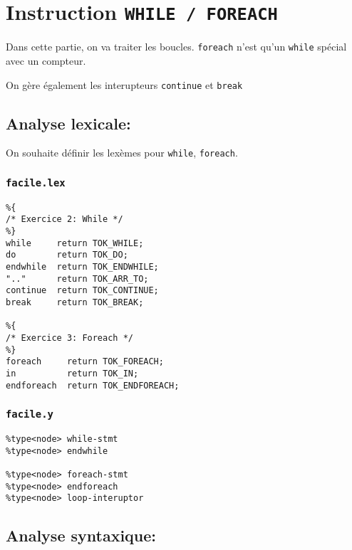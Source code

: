 \documentclass[11pt]{article}
\begin{document}
    \hypertarget{instruction-while-foreach}{%
\section{\texorpdfstring{Instruction
\texttt{WHILE\ /\ FOREACH}}{Instruction WHILE / FOREACH}}\label{instruction-while-foreach}}

Dans cette partie, on va traiter les boucles. \texttt{foreach} n'est
qu'un \texttt{while} spécial avec un compteur.

On gère également les interupteurs \texttt{continue} et \texttt{break}

    \hypertarget{analyse-lexicale}{%
\subsection{Analyse lexicale:}\label{analyse-lexicale}}

On souhaite définir les lexèmes pour \texttt{while}, \texttt{foreach}.

\hypertarget{facile.lex}{%
\subsubsection{\texorpdfstring{\texttt{facile.lex}}{facile.lex}}\label{facile.lex}}

\begin{verbatim}
%{
/* Exercice 2: While */ 
%}
while     return TOK_WHILE;
do        return TOK_DO;
endwhile  return TOK_ENDWHILE;
".."      return TOK_ARR_TO;
continue  return TOK_CONTINUE;
break     return TOK_BREAK;

%{
/* Exercice 3: Foreach */ 
%}
foreach     return TOK_FOREACH;
in          return TOK_IN;
endforeach  return TOK_ENDFOREACH;
\end{verbatim}

\hypertarget{facile.y}{%
\subsubsection{\texorpdfstring{\texttt{facile.y}}{facile.y}}\label{facile.y}}

\begin{verbatim}
%type<node> while-stmt
%type<node> endwhile

%type<node> foreach-stmt
%type<node> endforeach
%type<node> loop-interuptor
\end{verbatim}

    \hypertarget{analyse-syntaxique}{%
\subsection{Analyse syntaxique:}\label{analyse-syntaxique}}
\end{document}
